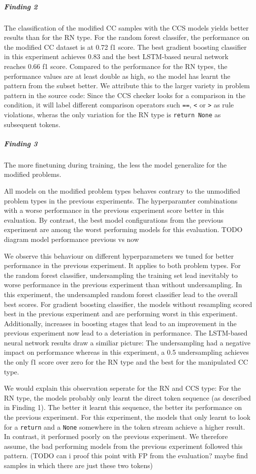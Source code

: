\subparagraph{Finding 2}
The classification of the modified CC samples with the CCS models yields better results than for the RN type.
For the random forest classifer, the performance on the modified CC dataset is at 0.72 f1 score. The best gradient boosting classifier in this experiment achieves 0.83 and the best LSTM-based neural network reaches 0.66 f1 score. 
Compared to the performance for the RN types, the performance values are at least double as high, so the model has learnt the pattern from the subset better. We attribute this to the larger variety in problem pattern in the source code: Since the CCS checker looks for a comparison in the condition, it will label different comparison operators such \texttt{==}, \texttt{<} or \texttt{>} as rule violations, wheras the only variation for the RN type is \texttt{return None} as subsequent tokens.

\subparagraph{Finding 3}\label{finding:better_vs_worse}
The more finetuning during training, the less the model generalize for the modified problems.

All models on the modified problem types behaves contrary to the unmodified problem types in the previous experiments. The hyperparamter combinations with a worse performance in the previous experiment score better in this evaluation. By contrast, the best model configurations from the previous experiment are among the worst performing models for this evaluation.  
TODO diagram model performance previous vs now

We observe this behaviour on different hyperparameters we tuned for better performance in the previous experiment. It applies to both problem types.
For the random forest classifier, undersampling the training set lead inevitably to worse performance in the previous experiment than without undersampling. In this experiment, the undersampled random forest classifier lead to the overall best scores. For gradient boosting classifier, the models without resampling scored best in the previous experiment and are performing worst in this experiment. Additionally, increases in boosting stages that lead to an improvement in the previous experiment now lead to a deteriation in performance. 
The LSTM-based neural network results draw a similiar picture: The undersampling had a negative impact on performance whereas in this experiment, a 0.5 undersampling achieves the only f1 score over zero for the RN type and the best for the manipulated CC type.

We would explain this observation seperate for the RN and CCS type:
For the RN type, the models probably only learnt the direct token sequence (as described in Finding 1). The better it learnt this sequence, the better its performance on the previous experiment. For this experiment, the models that only learnt to look for a \texttt{return} and a \texttt{None} somewhere in the token stream achieve a higher result. In contrast, it performed poorly on the previous experiment. We therefore assume, the bad performing models from the previous experiment followed this pattern. (TODO can i proof this point with FP from the evaluation? maybe find samples in which there are just these two tokens)

